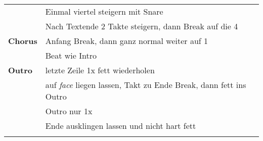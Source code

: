 \begin{tabular}{p{1.6cm}l}
	                & Einmal viertel steigern mit Snare                                        \\
	                & Nach Textende 2 Takte steigern, dann Break auf die 4                     \\
	\textbf{Chorus} & Anfang Break, dann ganz normal weiter auf 1                              \\
	                & Beat wie Intro                                                           \\
	\textbf{Outro}  & letzte Zeile 1x fett wiederholen                                         \\
	                & auf \textit{face} liegen lassen, Takt zu Ende Break, dann fett ins Outro \\
	                & Outro nur 1x                                                             \\
	                & Ende ausklingen lassen und nicht hart fett                               \\
	                &                                                                          \\
\end{tabular}
